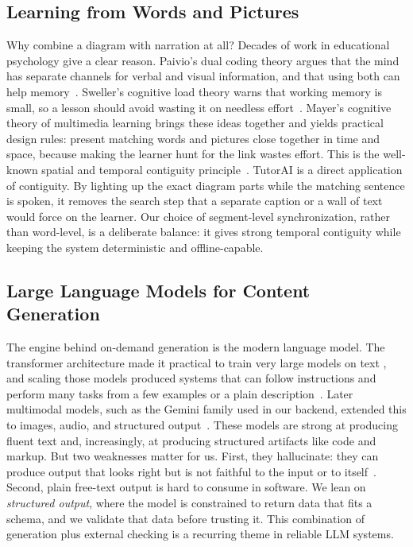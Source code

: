\documentclass[conference]{IEEEtran}
\begin{document}
\subsection{Learning from Words and Pictures}
Why combine a diagram with narration at all? Decades of work in educational
psychology give a clear reason. Paivio's dual coding theory argues that the
mind has separate channels for verbal and visual information, and that using
both can help memory~\cite{paivio1991}. Sweller's cognitive load theory warns
that working memory is small, so a lesson should avoid wasting it on needless
effort~\cite{sweller1988}. Mayer's cognitive theory of multimedia learning
brings these ideas together and yields practical design rules: present matching
words and pictures close together in time and space, because making the learner
hunt for the link wastes effort. This is the well-known spatial and temporal
contiguity principle~\cite{mayer2014multimedia,mayermoreno2003}. TutorAI is a
direct application of contiguity. By lighting up the exact diagram parts while
the matching sentence is spoken, it removes the search step that a separate
caption or a wall of text would force on the learner. Our choice of
segment-level synchronization, rather than word-level, is a deliberate balance:
it gives strong temporal contiguity while keeping the system deterministic and
offline-capable.

\subsection{Large Language Models for Content Generation}
The engine behind on-demand generation is the modern language model. The
transformer architecture made it practical to train very large models on text
\cite{vaswani2017attention}, and scaling those models produced systems that can
follow instructions and perform many tasks from a few examples or a plain
description~\cite{brown2020gpt3}. Later multimodal models, such as the Gemini
family used in our backend, extended this to images, audio, and structured
output~\cite{gemini2023}. These models are strong at producing fluent text and,
increasingly, at producing structured artifacts like code and markup. But two
weaknesses matter for us. First, they hallucinate: they can produce output that
looks right but is not faithful to the input or to itself~\cite{ji2023hallucination}.
Second, plain free-text output is hard to consume in software. We lean on
\emph{structured output}, where the model is constrained to return data that
fits a schema, and we validate that data before trusting it. This combination of
generation plus external checking is a recurring theme in reliable LLM systems.
\end{document}
